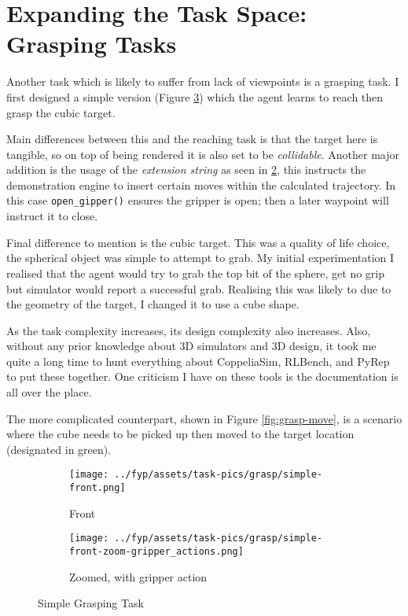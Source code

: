 \section{Expanding the Task Space: Grasping Tasks}
Another task which is likely to suffer from lack of viewpoints is a grasping task. I first designed
a simple version (Figure \ref{fig:grasp-simple}) which the agent learns to reach then grasp the cubic target. 

Main differences between this and the reaching task is that the target here is tangible, so on top of being rendered it is also set to be \emph{collidable}. Another major addition is the usage of the \emph{extension string} as seen in \ref{subfig:simple-zoom-actions}, this instructs the demonstration engine to insert certain moves within the calculated trajectory. In this case \verb|open_gipper()| ensures the gripper is open; then a later waypoint will instruct it to close. 

Final difference to mention is the cubic target. This was a quality of life choice, the spherical object was simple to attempt to grab. My initial experimentation I realised that the agent would try to grab the top bit of the sphere, get no grip but simulator would report a successful grab. Realising this was likely to due to the geometry of the target, I changed it to use a cube shape.

As the task complexity increases, its design complexity also increases. Also, without any prior knowledge about 3D simulators and 3D design, it took me quite a long time to hunt everything about CoppeliaSim, RLBench, and PyRep to put these together. One criticism I have on these tools is the documentation is all over the place. 

The more complicated counterpart, shown in Figure \ref{fig:grasp-move}, is a scenario where the cube needs to be picked up then moved to the target location (designated in green).

\begin{figure}[htpb] %
  \centering
  \begin{subfigure}{0.3\linewidth}
    \centering
    \texttt{[image: ../fyp/assets/task-pics/grasp/simple-front.png]}
    \caption{Front}\label{subfig:simple-front}
  \end{subfigure}
  \begin{subfigure}{0.5\linewidth}
    \centering
    \texttt{[image: ../fyp/assets/task-pics/grasp/simple-front-zoom-gripper\_actions.png]}
    \caption{Zoomed, with gripper action}\label{subfig:simple-zoom-actions}
  \end{subfigure}
  \caption{Simple Grasping Task}\label{fig:grasp-simple}
\end{figure}

